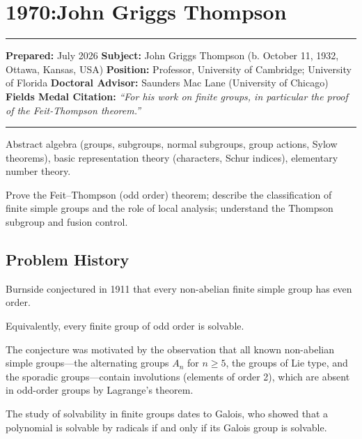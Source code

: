 \chapter{1970:John Griggs Thompson}\label{ch1970johngriggsthompson:john-griggs-thompson-fields-medal-1970-a-comprehensive-report-on-his-work-and-impact}

\begin{center}\rule{0.5\linewidth}{0.5pt}\end{center}

\textbf{Prepared:} July 2026
\textbf{Subject:} John Griggs Thompson (b. October 11, 1932, Ottawa, Kansas, USA)
\textbf{Position:} Professor, University of Cambridge; University of Florida
\textbf{Doctoral Advisor:} Saunders Mac Lane (University of Chicago)
\textbf{Fields Medal Citation:} \emph{``For his work on finite groups, in particular the proof of the Feit-Thompson theorem.''}

\begin{center}\rule{0.5\linewidth}{0.5pt}\end{center}

\begin{prereqs}
Abstract algebra (groups, subgroups, normal subgroups, group actions, Sylow theorems), basic representation theory (characters, Schur indices), elementary number theory.
\end{prereqs}

\begin{objectives}
Prove the Feit--Thompson (odd order) theorem; describe the classification of finite simple groups and the role of local analysis; understand the Thompson subgroup and fusion control.
\end{objectives}

\section{Problem History}

Burnside conjectured in 1911 that every non-abelian finite simple group has even order.

Equivalently, every finite group of odd order is solvable.

The conjecture was motivated by the observation that all known non-abelian simple groups---the alternating groups $A_n$ for $n \geq 5$, the groups of Lie type, and the sporadic groups---contain involutions (elements of order 2), which are absent in odd-order groups by Lagrange's theorem.

The study of solvability in finite groups dates to Galois, who showed that a polynomial is solvable by radicals if and only if its Galois group is solvable.

